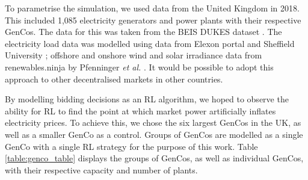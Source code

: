 To parametrise the simulation, we used data from the United Kingdom in 2018. This included 1,085 electricity generators and power plants with their respective GenCos. The data for this was taken from the BEIS DUKES dataset \cite{dukes_511}. The electricity load data was modelled using data from Elexon portal and Sheffield University \cite{gbnationalgridstatus2019}; offshore and onshore wind and solar irradiance data from renewables.ninja by Pfenninger \textit{et al.} \cite{Pfenninger2016}. It would be possible to adopt this approach to other decentralised markets in other countries.

By modelling bidding decisions as an RL algorithm, we hoped to observe the ability for RL to find the point at which market power artificially inflates electricity prices. To achieve this, we chose the six largest GenCos in the UK, as well as a smaller GenCo as a control. Groups of GenCos are modelled as a single GenCo with a single RL strategy for the purpose of this work. Table \ref{table:genco_table} displays the groups of GenCos, as well as individual GenCos, with their respective capacity and number of plants.





